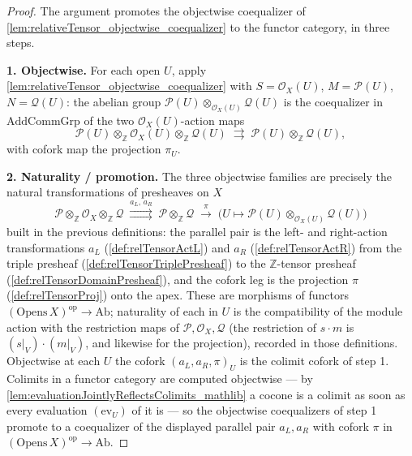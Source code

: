 \begin{proof}
    \leanok
  The argument promotes the objectwise coequalizer of
  \cref{lem:relativeTensor_objectwise_coequalizer} to the functor category, in
  three steps.

  \textbf{1. Objectwise.} For each open \(U\), apply
  \cref{lem:relativeTensor_objectwise_coequalizer} with \(S = \mathcal{O}_X(U)\),
  \(M = \mathcal{P}(U)\), \(N = \mathcal{Q}(U)\): the abelian group
  \(\mathcal{P}(U) \otimes_{\mathcal{O}_X(U)} \mathcal{Q}(U)\) is the coequalizer
  in \(\mathrm{AddCommGrp}\) of the two \(\mathcal{O}_X(U)\)-action maps
  \[
    \mathcal{P}(U) \otimes_{\mathbb{Z}} \mathcal{O}_X(U)
      \otimes_{\mathbb{Z}} \mathcal{Q}(U)
    \;\rightrightarrows\;
    \mathcal{P}(U) \otimes_{\mathbb{Z}} \mathcal{Q}(U),
  \]
  with cofork map the projection \(\pi_U\).

  \textbf{2. Naturality / promotion.} The three objectwise families are precisely
  the natural transformations of presheaves on \(X\)
  \[
    \mathcal{P} \otimes_{\mathbb{Z}} \mathcal{O}_X
      \otimes_{\mathbb{Z}} \mathcal{Q}
    \;\overset{a_L,\,a_R}{\rightrightarrows}\;
    \mathcal{P} \otimes_{\mathbb{Z}} \mathcal{Q}
    \;\overset{\pi}{\longrightarrow}\;
    \bigl(U \mapsto \mathcal{P}(U) \otimes_{\mathcal{O}_X(U)} \mathcal{Q}(U)\bigr)
  \]
  built in the previous definitions: the parallel pair is the left- and
  right-action transformations \(a_L\) (\cref{def:relTensorActL}) and \(a_R\)
  (\cref{def:relTensorActR}) from the triple presheaf
  (\cref{def:relTensorTriplePresheaf}) to the \(\mathbb{Z}\)-tensor presheaf
  (\cref{def:relTensorDomainPresheaf}), and the cofork leg is the projection
  \(\pi\) (\cref{def:relTensorProj}) onto the apex. These are morphisms of
  functors \((\mathrm{Opens}\,X)^{\mathrm{op}} \to \mathrm{Ab}\); naturality of
  each in \(U\) is the compatibility of the module action with the restriction
  maps of \(\mathcal{P}, \mathcal{O}_X, \mathcal{Q}\) (the restriction of
  \(s \cdot m\) is \((s|_V) \cdot (m|_V)\), and likewise for the projection),
  recorded in those definitions. Objectwise at each \(U\) the cofork
  \((a_L, a_R, \pi)_U\) is the colimit cofork of step 1. Colimits in a functor
  category are computed objectwise --- by
  \cref{lem:evaluationJointlyReflectsColimits_mathlib} a cocone is a colimit as
  soon as every evaluation \((\mathrm{ev}_U)\) of it is --- so the objectwise
  coequalizers of step 1 promote to a coequalizer of the displayed parallel pair
  \(a_L, a_R\) with cofork \(\pi\) in
  \((\mathrm{Opens}\,X)^{\mathrm{op}} \to \mathrm{Ab}\).


\end{proof}
